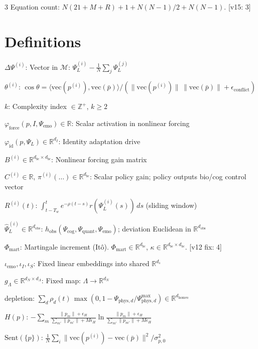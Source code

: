 \documentclass[8pt,landscape]{extarticle}
\newcommand{\fix}[1]{\textcolor{fixcolor}{#1}}
\newcommand{\fixlabel}[1]{\textcolor{fixcolor}{\textsf{\scriptsize[v12 fix: #1]}}}
\newcommand{\vfive}[1]{\textcolor{v15color}{#1}}
\newcommand{\vfivelabel}[1]{\textcolor{v15color}{\textsf{\scriptsize[v15: #1]}}}
\begin{document}
\begin{multicols}{3}
Equation count: \vfive{$N(21+M+R) + 1 + N(N{-}1)/2 + N(N{-}1)$.} \vfivelabel{3}

\section*{Definitions}

$\Delta\Psi^{(i)}$: Vector in $\mathcal{M}$: $\Psi^{(i)}_L - \tfrac{1}{N}\sum_j \Psi^{(j)}_L$

$\theta^{(i)}$: $\cos\theta = \langle \mathrm{vec}(p^{(i)}), \mathrm{vec}(\bar{p})\rangle / (\|\mathrm{vec}(p^{(i)})\|\,\|\mathrm{vec}(\bar{p})\| + \epsilon_{\mathrm{conflict}})$

$k$: Complexity index $\in \mathbb{Z}^+$, $k \ge 2$

$\varphi_{\mathrm{force}}(p, I, \Psi_{\mathrm{emo}}) \in \mathbb{R}$: Scalar activation in nonlinear forcing

$\varphi_{\mathrm{id}}(p, \Psi_L) \in \mathbb{R}^{d_I}$: Identity adaptation drive

$B^{(i)} \in \mathbb{R}^{d_{bc} \times d_{bc}}$: Nonlinear forcing gain matrix

$C^{(i)} \in \mathbb{R}$, $\pi^{(i)}(\ldots) \in \mathbb{R}^{d_{bc}}$: Scalar policy gain; policy outputs bio/cog control vector

$R^{(i)}(t)$: $\int_{t-T_w}^{t} e^{-\rho(t-s)} r(\Psi^{(i)}_L(s))\,ds$ (sliding window)

$\hat\Psi^{(i)}_L \in \mathbb{R}^{d_{\mathrm{obs}}}$: $h_{\mathrm{obs}}(\Psi_{\mathrm{cog}}, \Psi_{\mathrm{quant}}, \Psi_{\mathrm{emo}})$; deviation Euclidean in $\mathbb{R}^{d_{\mathrm{obs}}}$

$\Phi_{\mathrm{mart}}$: Martingale increment (It\^o). \fix{$\Phi_{\mathrm{mart}} \in \mathbb{R}^{d_{bc}}$, $\kappa \in \mathbb{R}^{d_{bc} \times d_{bc}}$.} \fixlabel{4}

$\iota_{\mathrm{emo}}, \iota_I, \iota_S$: Fixed linear embeddings into shared $\mathbb{R}^{d_s}$

$g_\Lambda \in \mathbb{R}^{d_N \times d_\Lambda}$: Fixed map: $\Lambda \to \mathbb{R}^{d_N}$

depletion: $\sum_d \rho_d(t)\,\max(0, 1 - \Psi_{\mathrm{phys},d}/\Psi^{\max}_{\mathrm{phys},d}) \in \mathbb{R}^{d_{\mathrm{homeo}}}$

$H(p)$: $-\sum_m \frac{\|p_m\| + \epsilon_H}{\sum_{m'} \|p_{m'}\| + M\epsilon_H} \ln \frac{\|p_m\| + \epsilon_H}{\sum_{m'} \|p_{m'}\| + M\epsilon_H}$

$\mathrm{Sent}(\{p\})$: $\frac{1}{N}\sum_i \|\mathrm{vec}(p^{(i)}) - \mathrm{vec}(\bar{p})\|^2 / \sigma^2_{p,0}$


\end{multicols}
\end{document}
